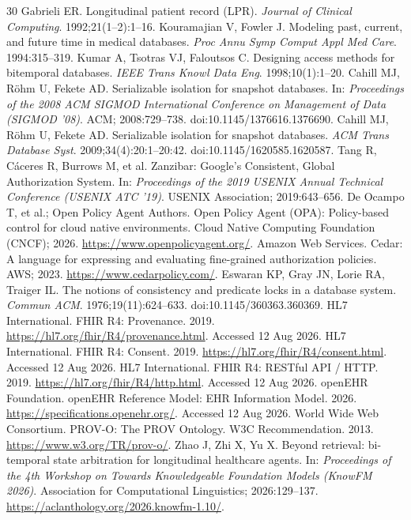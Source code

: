 \documentclass[11pt]{article}
\begin{document}
\begin{thebibliography}{30}
 Gabrieli ER. Longitudinal patient record (LPR). \emph{Journal of Clinical Computing}. 1992;21(1--2):1--16.
 Kouramajian V, Fowler J. Modeling past, current, and future time in medical databases. \emph{Proc Annu Symp Comput Appl Med Care}. 1994:315--319.
 Kumar A, Tsotras VJ, Faloutsos C. Designing access methods for bitemporal databases. \emph{IEEE Trans Knowl Data Eng}. 1998;10(1):1--20.
 Cahill MJ, R{\"o}hm U, Fekete AD. Serializable isolation for snapshot databases. In: \emph{Proceedings of the 2008 ACM SIGMOD International Conference on Management of Data (SIGMOD '08)}. ACM; 2008:729--738. doi:10.1145/1376616.1376690.
 Cahill MJ, R{\"o}hm U, Fekete AD. Serializable isolation for snapshot databases. \emph{ACM Trans Database Syst}. 2009;34(4):20:1--20:42. doi:10.1145/1620585.1620587.
 Tang R, C{\'a}ceres R, Burrows M, et al. Zanzibar: Google's Consistent, Global Authorization System. In: \emph{Proceedings of the 2019 USENIX Annual Technical Conference (USENIX ATC '19)}. USENIX Association; 2019:643--656.
 De Ocampo T, et al.; Open Policy Agent Authors. Open Policy Agent (OPA): Policy-based control for cloud native environments. Cloud Native Computing Foundation (CNCF); 2026. \url{https://www.openpolicyagent.org/}.
 Amazon Web Services. Cedar: A language for expressing and evaluating fine-grained authorization policies. AWS; 2023. \url{https://www.cedarpolicy.com/}.
 Eswaran KP, Gray JN, Lorie RA, Traiger IL. The notions of consistency and predicate locks in a database system. \emph{Commun ACM}. 1976;19(11):624--633. doi:10.1145/360363.360369.
 HL7 International. FHIR R4: Provenance. 2019. \url{https://hl7.org/fhir/R4/provenance.html}. Accessed 12 Aug 2026.
 HL7 International. FHIR R4: Consent. 2019. \url{https://hl7.org/fhir/R4/consent.html}. Accessed 12 Aug 2026.
 HL7 International. FHIR R4: RESTful API / HTTP. 2019. \url{https://hl7.org/fhir/R4/http.html}. Accessed 12 Aug 2026.
 openEHR Foundation. openEHR Reference Model: EHR Information Model. 2026. \url{https://specifications.openehr.org/}. Accessed 12 Aug 2026.
 World Wide Web Consortium. PROV-O: The PROV Ontology. W3C Recommendation. 2013. \url{https://www.w3.org/TR/prov-o/}.
 Zhao J, Zhi X, Yu X. Beyond retrieval: bi-temporal state arbitration for longitudinal healthcare agents. In: \emph{Proceedings of the 4th Workshop on Towards Knowledgeable Foundation Models (KnowFM 2026)}. Association for Computational Linguistics; 2026:129--137. \url{https://aclanthology.org/2026.knowfm-1.10/}.

\end{thebibliography}
\end{document}
